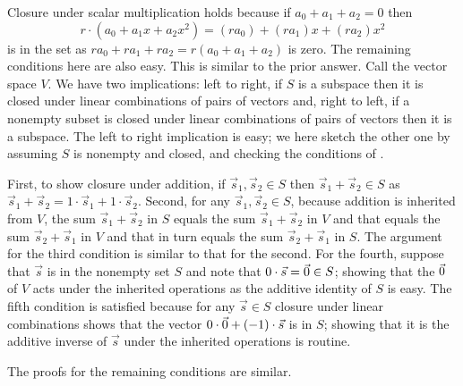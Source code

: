 \begin{exercises}
\begin{answer}
\begin{exparts}
          Closure under scalar multiplication holds because
          if \( a_0+a_1+a_2=0 \) then
          \begin{equation*}
            r\cdot(a_0+a_1x+a_2x^2)=
            (ra_0)+(ra_1)x+(ra_2)x^2
          \end{equation*}
          is in the set as \( ra_0+ra_1+ra_2=r(a_0+a_1+a_2) \) is zero.
          The remaining conditions here are also easy.
        \partsitem This is similar to the prior answer.
        \partsitem Call the vector space \( V \).
          We have two implications: left to right, if \( S \) is a subspace
          then it is closed under linear combinations of pairs of vectors and,
          right to left, if a nonempty subset is closed under linear
          combinations of pairs of vectors then it is a subspace.
          The left to right implication is easy; we here sketch the
          other one by
          assuming \( S \) is nonempty and closed, and checking the conditions
          of .

          First, to show closure under addition, if
          \( \vec{s}_1,\vec{s}_2\in S \) then \( \vec{s}_1+\vec{s}_2\in S \)
          as \( \vec{s}_1+\vec{s}_2=1\cdot\vec{s}_1+1\cdot\vec{s}_2 \).
          Second, for any \( \vec{s}_1,\vec{s}_2\in S \), because addition
          is inherited from \( V \), the sum \( \vec{s}_1+\vec{s}_2 \)
          in \( S \) equals the sum \( \vec{s}_1+\vec{s}_2 \)
          in \( V \) and that equals the sum \( \vec{s}_2+\vec{s}_1 \) in
          \( V \) and that in turn equals the sum \( \vec{s}_2+\vec{s}_1 \) in
          \( S \).
          The argument for the third condition is similar to that for the
          second.
          For the fourth, suppose that 
          \( \vec{s} \) is in the nonempty set \( S \)
          and note that \( 0\cdot\vec{s}=\vec{0}\in S \); showing that 
          the \( \vec{0} \) of
          \( V \) acts under the inherited operations as the additive identity
          of \( S \) is easy.
          The fifth condition is satisfied because for any \( \vec{s}\in S \)
          closure under linear combinations shows that the vector
          \( 0\cdot\vec{0}+(-1)\cdot\vec{s} \) is in \( S \); showing 
          that it is the
          additive inverse of \( \vec{s} \) under the inherited operations is
          routine.

          The proofs for the remaining conditions are similar.
      \end{exparts}  
    \end{answer}
\end{exercises}





















